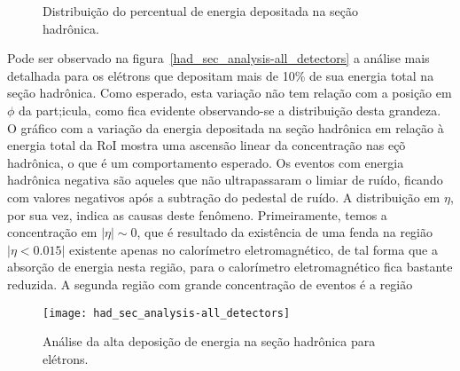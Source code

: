 \begin{figure}
\centering 
{}
\caption{Distribuição do percentual de energia depositada na seção hadrônica.} 
\label{fig:energia_secao_hadronica} 
\end{figure} 

Pode ser observado na figura~\ref{had_sec_analysis-all_detectors} a análise mais detalhada para os elétrons que depositam mais de 10\% de sua energia total na seção hadrônica. Como esperado, esta variação não tem relação com a posição em $\phi$ da part;icula, como fica evidente observando-se a distribuição desta grandeza. O gráfico com a variação da energia depositada na seção hadrônica em relação à energia total da RoI mostra uma ascensão linear da concentração nas eçõ hadrônica, o que é um comportamento esperado. Os eventos com energia hadrônica negativa são aqueles que não ultrapassaram o limiar de ruído, ficando com valores negativos após a subtração do pedestal de ruído. A distribuição em $\eta$, por sua vez, indica as causas  deste fenômeno. Primeiramente, temos a concentração em $| \eta | \sim 0$, que é resultado da existência de uma fenda na região $| \eta \lt 0.015 |$ existente apenas no calorímetro eletromagnético, de tal forma que a absorção de energia nesta região, para o calorímetro eletromagnético fica bastante reduzida. A segunda região com grande concentração de eventos é a região  

\begin{figure}
\centering 
\texttt{[image: had\_sec\_analysis-all\_detectors]}
\caption{Análise da alta deposição de energia na seção hadrônica para elétrons.} 
\label{fig:analise_secao_hadronica_eletrons} 
\end{figure} 


